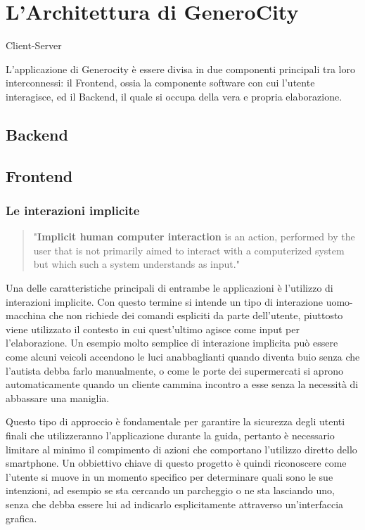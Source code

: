 \chapter{L'Architettura di GeneroCity}

Client-Server

L'applicazione di Generocity è essere divisa in due componenti principali tra loro interconnessi:  il Frontend, ossia la componente software  con cui l'utente interagisce, ed il Backend, il quale si occupa della vera e propria elaborazione.
\section{Backend}
\section{Frontend}
\subsection{Le interazioni implicite}
\begin{quote}
"\textbf{Implicit human computer interaction} is an action,
performed by the user that is not primarily aimed
to interact with a computerized system but which
such a system understands as input."\cite{ref:implicit-interaction}
\end{quote}
Una delle caratteristiche principali di entrambe le applicazioni è l'utilizzo di interazioni implicite. Con questo termine si intende un tipo di interazione uomo-macchina che non richiede dei comandi espliciti da parte dell'utente, piuttosto viene utilizzato il contesto in cui quest'ultimo agisce come input per l'elaborazione. Un esempio molto semplice di interazione implicita può essere come alcuni veicoli accendono le luci anabbaglianti quando diventa buio senza che l'autista debba farlo manualmente, o come le porte dei supermercati si aprono automaticamente quando un cliente cammina incontro a esse senza la necessità di abbassare una maniglia. 

Questo tipo di approccio è fondamentale per garantire la sicurezza degli utenti finali che utilizzeranno l'applicazione durante la guida, pertanto è necessario limitare al minimo il compimento di azioni che comportano l'utilizzo diretto dello smartphone. Un obbiettivo chiave di questo progetto è quindi riconoscere come l'utente si muove in un momento specifico per determinare quali sono le sue intenzioni, ad esempio se sta cercando un parcheggio o ne sta lasciando uno, senza che debba essere lui ad indicarlo esplicitamente attraverso un'interfaccia grafica.
